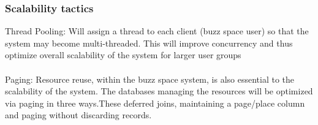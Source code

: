 \subsubsection{Scalability tactics}
Thread Pooling: Will assign a thread to each client (buzz space user) so that the system may become multi-threaded. This will improve concurrency and thus optimize overall scalability of the system for larger user groups\\
\\  
Paging: Resource reuse, within the buzz space system, is also essential to the scalability of the system. The databases managing the resources will be optimized via paging in three ways.These  deferred joins, maintaining a page/place column and paging without discarding records.       